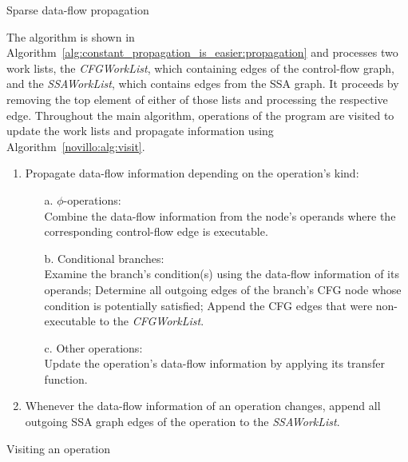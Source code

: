 \begin{algorithm}[h!]
  \caption{Sparse data-flow propagation}
  \label{alg:constant_propagation_is_easier:propagation}
\end{algorithm}


The algorithm is shown in 
Algorithm~\ref{alg:constant_propagation_is_easier:propagation} and
processes two work lists, the \emph{CFGWorkList}, which containing edges
of the control-flow graph, and the \emph{SSA\-Work\-List}, which contains edges
from the SSA graph.
It proceeds by removing the top element of either of those lists and
processing the respective edge.
Throughout the main algorithm, operations of
the program are visited to update the work lists and propagate
information using Algorithm~\ref{novillo:alg:visit}.

\begin{algorithm}[t!]
  \begin{enumerate}
    \item Propagate data-flow information depending on the operation's kind:
    \begin{enumerate}
      \vspace{-1.2ex}
      \item[a.] \label{novillo:alg:visit:phi} $\phi$-operations: \\
                Combine the data-flow information from the node's operands where
                the corresponding control-flow edge is executable.
      \item[b.] \label{novillo:alg:visit:branch} Conditional branches: \\
                Examine the branch's condition(s) using the data-flow
                information of its operands; Determine all outgoing edges of the
                branch's CFG node whose condition is potentially satisfied;
                Append the CFG edges that were non-executable to the
                \emph{CFGWorkList}.
      \item[c.] \label{novillo:alg:visit:regular} Other operations:\\
                Update the operation's data-flow information by applying its 
                transfer function.
    \end{enumerate}
    \vspace{-1ex}
    \item Whenever the data-flow information of an operation changes, append all
          outgoing SSA graph edges of the operation to the \emph{SSAWorkList}.
  \end{enumerate}
  \caption{Visiting an operation}
  \label{novillo:alg:visit}
\end{algorithm}

